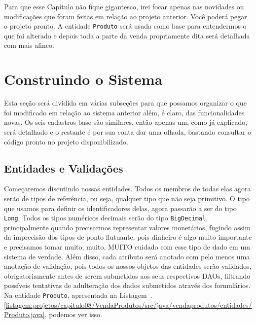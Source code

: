 Para que esse Capítulo não fique gigantesco, irei focar apenas nas novidades ou modificações que foram feitas em relação ao projeto anterior. Você poderá pegar o projeto pronto. A entidade \texttt{Produto} será usada como base para entendermos o que foi alterado e depois toda a parte da venda propriamente dita será detalhada com mais afinco.


\section{Construindo o Sistema}

Esta seção será dividida em várias subseções para que possamos organizar o que foi modificado em relação ao sistema anterior além, é claro, das funcionalidades novas. Os seis cadastros base são similares, então apenas um, como já explicado, será detalhado e o restante é por sua conta dar uma olhada, bastando consultar o código pronto no projeto disponibilizado.


\subsection{Entidades e Validações}

Começaremos discutindo nossas entidades. Todos os membros de todas elas agora serão de tipos de referência, ou seja, qualquer tipo que não seja primitivo. O tipo  que usamos para definir os identificadores delas, agora passarão a ser do tipo \texttt{Long}. Todos os tipos numéricos decimais serão do tipo \texttt{BigDecimal}, principalmente quando precisarmos representar valores monetários, fugindo assim da imprecisão dos tipos de ponto flutuante, pois dinheiro é algo muito importante e precisamos tomar muito, muito, MUITO cuidado com esse tipo de dado em um sistema de verdade. Além disso, cada atributo será anotado com pelo menos uma anotação de validação, pois todos os nossos objetos das entidades serão validados, obrigatoriamente antes de serem submetidos aos seus respectivos DAOs, filtrando possíveis tentativas de adulteração dos dados submetidos através dos formulários. Na entidade \texttt{Produto}, apresentada na Listagem~\thechapter.\ref{listagem:projetos/capitulo08/VendaProdutos/src/java/vendaprodutos/entidades/Produto.java}, podemos ver isso.


